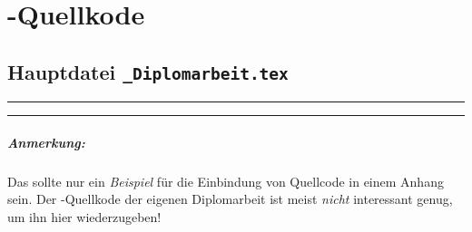 \chapter{\latex-Quellkode}
\label{app:latex}

\section*{Hauptdatei {\tt\_Diplomarbeit.tex}}

\begin{footnotesize}

\end{footnotesize}


\hrule
\hrule

\paragraph{Anmerkung:}
Das sollte nur ein \emph{Beispiel} für die Einbindung von Quellcode
in einem Anhang sein. Der \latex-Quellkode der eigenen
Diplomarbeit ist meist \emph{nicht} interessant genug, um ihn hier
wiederzugeben!

